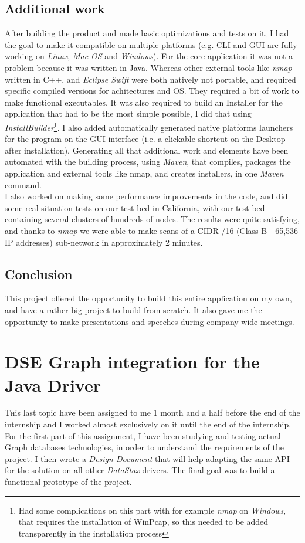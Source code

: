 \documentclass[a4paper]{report}
\newcommand{\ds}{\emph{DataStax\xspace}}
\begin{document}
\section{Additional work}
After building the product and made basic optimizations and tests on it, I had the goal to make it compatible on multiple platforms (e.g. CLI and GUI are fully working on \emph{Linux}, \emph{Mac OS} and \emph{Windows}). For the core application it was not a problem because it was written in Java. Whereas other external tools like \emph{nmap} written in C++, and \emph{Eclipse Swift} were both natively not portable, and required specific compiled versions for achitectures and OS. They required a bit of work to make functional executables. It was also required to build an Installer for the application that had to be the most simple possible, I did that using \emph{InstallBuilder}\footnote{Had some complications on this part with for example \emph{nmap} on \emph{Windows}, that requires the installation of WinPcap, so this needed to be added transparently in the installation process}. I also added automatically generated native platforms launchers for the program on the GUI interface (i.e. a clickable shortcut on the Desktop after installation). Generating all that additional work and elements have been automated with the building process, using \emph{Maven}, that compiles, packages the application and external tools like nmap, and creates installers, in one \emph{Maven} command.\\
I also worked on making some performance improvements in the code, and did some real situation tests on our test bed in California, with our test bed containing several clusters of hundreds of nodes. The results were quite satisfying, and thanks to \emph{nmap} we were able to make scans of a CIDR /16 (Class B - 65,536 IP addresses) sub-network in approximately 2 minutes.

\section{Conclusion}
This project offered the opportunity to build this entire application on my own, and have a rather big project to build from scratch. It also gave me the opportunity to make presentations and speeches during company-wide meetings.




\chapter{DSE Graph integration for the Java Driver}
\lettrine[nindent=0em,lines=3]{T}his last topic have been assigned to me 1 month and a half before the end of the internship and I worked almost exclusively on it until the end of the internship.\\
For the first part of this assignment, I have been studying and testing actual Graph databases technologies, in order to understand the requirements of the project. I then wrote a \emph{Design Document} that will help adapting the same API for the solution on all other \ds{} drivers. The final goal was to build a functional prototype of the project.
\end{document}
